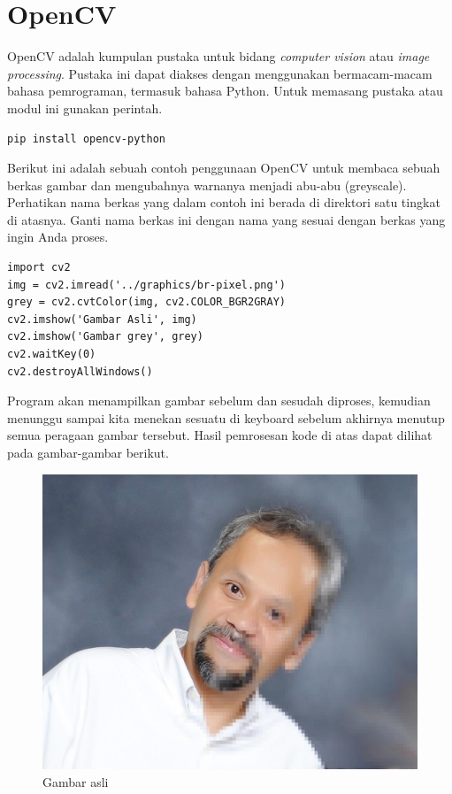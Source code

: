 \section{OpenCV}
OpenCV adalah kumpulan pustaka untuk bidang {\em computer vision}
atau {\em image processing}.
Pustaka ini dapat diakses dengan menggunakan bermacam-macam bahasa pemrograman,
termasuk bahasa Python.
Untuk memasang pustaka atau modul ini gunakan perintah.

\begin{verbatim}
pip install opencv-python
\end{verbatim}

Berikut ini adalah sebuah contoh penggunaan OpenCV untuk membaca
sebuah berkas gambar dan mengubahnya warnanya menjadi abu-abu (greyscale).
Perhatikan nama berkas yang dalam contoh ini berada di direktori
satu tingkat di atasnya. Ganti nama berkas ini dengan nama yang sesuai
dengan berkas yang ingin Anda proses.

\begin{verbatim}
import cv2
img = cv2.imread('../graphics/br-pixel.png')
grey = cv2.cvtColor(img, cv2.COLOR_BGR2GRAY)
cv2.imshow('Gambar Asli', img)
cv2.imshow('Gambar grey', grey)
cv2.waitKey(0)
cv2.destroyAllWindows()
\end{verbatim}

Program akan menampilkan gambar sebelum dan sesudah diproses,
kemudian menunggu sampai kita menekan sesuatu di keyboard sebelum
akhirnya menutup semua peragaan gambar tersebut.
Hasil pemrosesan kode di atas dapat dilihat pada gambar-gambar
berikut.

\begin{figure}
\includegraphics[width=1.0\linewidth]{graphics/br-pixel.png}
\caption{Gambar asli}
\end{figure}

